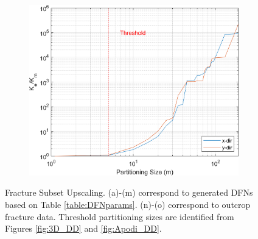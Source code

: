 \documentclass[Supplementary.tex]{subfiles}
\begin{document}
\begin{figure}[ht]
\begin{subfigure}{0.3\textwidth}
        \includegraphics[width=\textwidth]{FSU/Apodi4_FSU_nohead.png}
        \label{fig:FSU_Apodi_4}
    \end{subfigure}
    \caption{Fracture Subset Upscaling. (a)-(m) correspond to generated DFNs based on Table \ref{table:DFNparams}. (n)-(o) correspond to outcrop fracture data. Threshold partitioning sizes are identified from Figures \ref{fig:3D_DD} and \ref{fig:Apodi_DD}.}
    \label{fig:FSU}
\end{figure}
\end{document}

